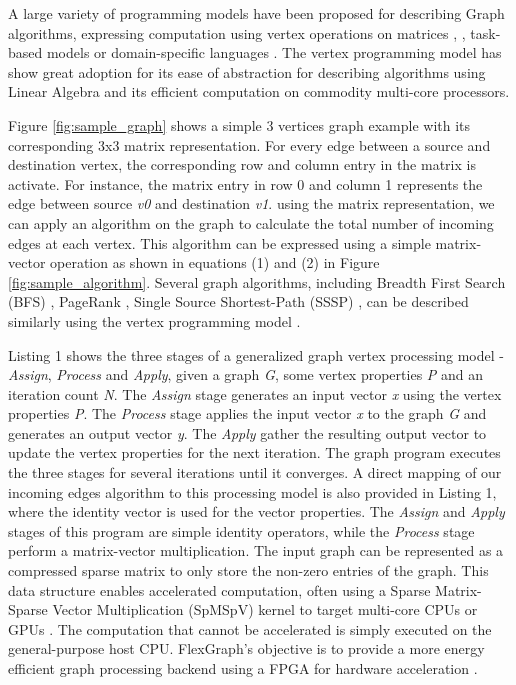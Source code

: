 A large variety of programming models have been proposed for describing Graph algorithms, expressing computation using vertex operations on matrices \cite{GraphMat} \cite{GraphLab}, \cite{Pregel}, \cite{MapGraph} \cite{GraphX} task-based models \cite{Galois} or domain-specific languages \cite{GreenMarl}. The vertex programming model has show great adoption for its ease of abstraction for describing algorithms using Linear Algebra and its efficient computation on commodity multi-core processors.

Figure \ref{fig:sample_graph} shows a simple 3 vertices graph example with its corresponding 3x3 matrix representation. For every edge between a source and destination vertex, the corresponding row and column entry in the matrix is activate. For instance, the matrix entry in row 0 and column 1 represents the edge between source \textit{v0} and destination \textit{v1}. using the matrix representation, we can apply an algorithm on the graph to calculate the total number of incoming edges at each vertex. This algorithm can be expressed using a simple matrix-vector operation as shown in equations (1) and (2) in Figure \ref{fig:sample_algorithm}. Several graph algorithms, including Breadth First Search (BFS) \cite{BFS}, PageRank \cite{PageRank}, Single Source Shortest-Path (SSSP) \cite{SSSP}, can be described similarly using the vertex programming model \cite{GraphMat}.

Listing 1 shows the three stages of a generalized graph vertex processing model - \textit{Assign}, \textit{Process} and \textit{Apply}, given a graph \textit{G}, some vertex properties \textit{P} and an iteration count \textit{N}. The \textit{Assign} stage generates an input vector \textit{x} using the vertex properties \textit{P}. The \textit{Process} stage applies the input vector \textit{x} to the graph \textit{G} and generates an output vector \textit{y}. The\textit{ Apply} gather the resulting output vector to update the vertex properties for the next iteration. The graph program executes the three stages for several iterations until it converges. A direct mapping of our incoming edges algorithm to this processing model is also provided in Listing 1, where the identity vector is used for the vector properties. The \textit{Assign} and \textit{Apply} stages of this program are simple identity operators, while the \textit{Process} stage perform a matrix-vector multiplication. The input graph can be represented as a compressed sparse matrix to only store the non-zero entries of the graph. This data structure enables accelerated computation, often using a Sparse Matrix-Sparse Vector Multiplication (SpMSpV) kernel to target multi-core CPUs \cite{GraphMat} or GPUs \cite{MapGraph}. The computation that cannot be accelerated is simply executed on the general-purpose host CPU. FlexGraph's objective is to provide a more energy efficient graph processing backend using a FPGA for hardware acceleration \cite{Catapult}.

